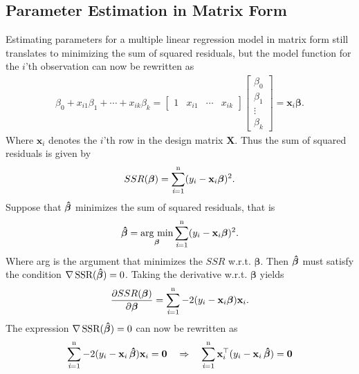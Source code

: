 \subsection{Parameter Estimation in Matrix Form}
Estimating parameters for a multiple linear regression model in matrix form still translates to minimizing the sum of squared residuals, but the model function for the $i$'th observation can now be rewritten as
\begin{align*}
    \beta_0 + x_{i1} \beta_1 + \cdots + x_{ik}\beta_k =
    \begin{bmatrix} 
    1 & x_{i1} & \cdots & x_{ik}  
    \end{bmatrix} 
    \begin{bmatrix}
    \beta_0 \\ \beta_1 \\ \vdots \\ \beta_k
    \end{bmatrix} = \mathbf{x}_i \boldsymbol{\beta}.
\end{align*}
Where $\mathbf{x}_i$ denotes the $i$'th row in the design matrix $\mathbf{X}$.
Thus the sum of squared residuals is given by
\begin{align*}
    SSR(\boldsymbol{\beta}) = \operatorname{\sum_{\textit{i}=1}^n} (y_i - \mathbf{x}_i\boldsymbol{\beta})^2.
\end{align*}
Suppose that $\operatorname{\boldsymbol{\hat{\beta}}}$ minimizes the sum of squared residuals, that is
\begin{align*}
    \operatorname{\boldsymbol{\hat{\beta}}} = \underset{\boldsymbol{\beta}}{\operatorname{\text{arg min}}} \operatorname{\sum_{\textit{i}=1}^n} (y_i - \mathbf{x}_i\boldsymbol{\beta})^2.
\end{align*}
Where arg is the argument that minimizes the $SSR$ w.r.t.$\!$ $\boldsymbol{\beta}$. Then $\operatorname{\boldsymbol{\hat{\beta}}}$ must satisfy the condition $\nabla \operatorname{\text{SSR}}(\operatorname{\boldsymbol{\hat{\beta}}}) = 0$.
Taking the derivative w.r.t. $\boldsymbol{\beta}$ yields
\begin{align}\label{eq:ssr_derivative}
    \frac{\partial SSR(\boldsymbol{\beta})}{\partial \boldsymbol{\beta}} 
    =  \operatorname{\sum_{\textit{i}=1}^n} -2(y_i - \mathbf{x}_i \boldsymbol{\beta})\mathbf{x}_i.
\end{align}
The expression $\nabla \operatorname{\text{SSR}} (\operatorname{\boldsymbol{\hat{\beta}}}) = 0$ can now be rewritten as
\begin{align*}
    \operatorname{\sum_{\textit{i}=1}^n} -2(y_i - \mathbf{x}_i \operatorname{\boldsymbol{\hat{\beta}}})\mathbf{x}_i = \mathbf{0} 
    \quad \Rightarrow \quad
    \operatorname{\sum_{\textit{i}=1}^n} \mathbf{x}_i^\top(y_i - \mathbf{x}_i \operatorname{\boldsymbol{\hat{\beta}}}) = \mathbf{0}
\end{align*}
